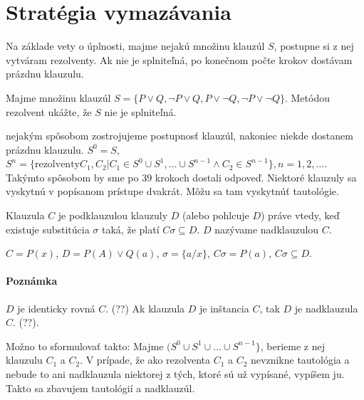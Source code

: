 \section{Stratégia vymazávania}
\startFIXME
Na základe vety o úplnosti, majme nejakú množinu klauzúl $S$, postupne si z nej
vytváram rezolventy. Ak nie je splniteľná, po konečnom počte krokov dostávam
prázdnu klauzulu.

\begin{priklad}
    Majme množinu klauzúl $S=\{P\lor Q, \neg P\lor Q, P \lor
    \neg Q, \neg P \lor \neg Q\}$. Metódou rezolvent ukážte, že $S$ nie je
    splniteľná.

    \par nejakým spôsobom zostrojujeme postupnosť klauzúl, nakoniec niekde dostanem
    prázdnu klauzulu. 
    $S^0 = S$, $S^n = \{ \mbox{rezolventy} C_1, C_2 | C_1 \in S^0 \cup S^1,
    \ldots \cup S^{n-1} \land C_2 \in S^{n-1}\}, n=1, 2, \ldots$. Takýmto spôsobom
    by sme po $39$ krokoch dostali odpoveď. Niektoré klauzuly sa vyskytnú v
    popísanom prístupe dvakrát. Môžu sa tam vyskytnúť tautológie.
\end{priklad}

\begin{definicia}
    Klauzula $C$ je podklauzulou klauzuly $D$ (alebo pohlcuje
    $D$) práve vtedy, keď existuje substitúcia $\sigma$ taká, že platí $C\sigma
    \subseteq D$. $D$ nazývame nadklauzulou $C$.
\end{definicia}

\begin{priklad}
    $C = P(x)$, $D = P(A) \lor Q(a)$, $\sigma = \{a/x\}$,
    $C\sigma = P(a)$, $C\sigma \subseteq D$.
\end{priklad}

\paragraph{Poznámka} $D$ je identicky rovná $C$. (??)
Ak klauzula $D$ je inštancia $C$, tak $D$ je nadklauzula $C$. (??). 

\par
Možno to sformulovať takto: Majme $(S^0 \cup S^1 \cup \ldots \cup
S^{n-1}\}$, berieme z nej klauzulu $C_1$ a $C_2$. V prípade, že ako rezolventa
$C_1$ a $C_2$ nevznikne tautológia a nebude to ani nadklauzula niektorej z tých,
ktoré sú už vypísané, vypíšem ju. Takto sa zbavujem tautológií a nadklauzúl.

